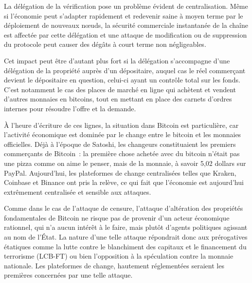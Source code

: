 La délégation de la vérification pose un problème évident de centralisation. Même si l'économie peut s'adapter rapidement et redevenir saine à moyen terme par le déploiement de nouveaux nœuds, la sécurité commerciale instantanée de la chaîne est affectée par cette délégation et une attaque de modification ou de suppression du protocole peut causer des dégâts à court terme non négligeables.

Cet impact peut être d'autant plus fort si la délégation s'accompagne d'une délégation de la propriété auprès d'un dépositaire, auquel cas le réel commerçant devient le dépositaire en question, celui-ci ayant un contrôle total sur les fonds. C'est notamment le cas des places de marché en ligne qui achètent et vendent d'autres monnaies en bitcoins, tout en mettant en place des carnets d'ordres internes pour résoudre l'offre et la demande.

À l'heure d'écriture de ces lignes, la situation dans Bitcoin est particulière, car l'activité économique est dominée par le change entre le bitcoin et les monnaies officielles. Déjà à l'époque de Satoshi, les changeurs constituaient les premiers commerçants de Bitcoin~: la première chose achetée avec du bitcoin n'était pas une pizza comme on aime le penser, mais de la monnaie, à savoir 5,02 dollars sur PayPal. Aujourd'hui, les plateformes de change centralisées telles que Kraken, Coinbase et Binance ont pris la relève, ce qui fait que l'économie est aujourd'hui extrêmement centralisée et sensible aux attaques.

Comme dans le cas de l'attaque de censure, l'attaque d'altération des propriétés fondamentales de Bitcoin ne risque pas de provenir d'un acteur économique rationnel, qui n'a aucun intérêt à le faire, mais plutôt d'agents politiques agissant au nom de l'État. La nature d'une telle attaque répondrait donc aux prérogatives étatiques comme la lutte contre le blanchiment des capitaux et le financement du terrorisme (LCB-FT) ou bien l'opposition à la spéculation contre la monnaie nationale. Les plateformes de change, hautement réglementées seraient les premières concernées par une telle attaque.

